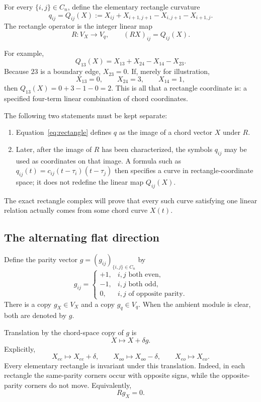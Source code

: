 \documentclass[11pt]{article}
\theoremstyle{definition}
\begin{document}
For every $\{i,j\}\in C_n$, define the elementary rectangle curvature
\begin{equation}
q_{ij}=Q_{ij}(X)
:=X_{ij}+X_{i+1,j+1}-X_{i,j+1}-X_{i+1,j}.
\label{eq:rectangle}
\end{equation}
The rectangle operator is the integer linear map
\begin{equation}
R:V_X\longrightarrow V_q,
\qquad
(RX)_{ij}=Q_{ij}(X).
\label{eq:R-map}
\end{equation}

For example,
\[
Q_{13}(X)=X_{13}+X_{24}-X_{14}-X_{23}.
\]
Because $23$ is a boundary edge, $X_{23}=0$.  If, merely for illustration,
\[
X_{13}=0,\qquad X_{24}=3,\qquad X_{14}=1,
\]
then $Q_{13}(X)=0+3-1-0=2$.  This is all that a rectangle coordinate is: a
specified four-term linear combination of chord coordinates.

The following two statements must be kept separate:
\begin{enumerate}
\item Equation~\eqref{eq:rectangle} defines $q$ as the image of a chord vector $X$ under $R$.
\item Later, after the image of $R$ has been characterized, the symbols $q_{ij}$ may be used as coordinates on that image.  A formula such as $q_{ij}(t)=c_{ij}(t-\tau_i)(t-\tau_j)$ then specifies a curve in rectangle-coordinate space; it does not redefine the linear map $Q_{ij}(X)$.
\end{enumerate}
The exact rectangle complex will prove that every such curve satisfying one linear relation actually comes from some chord curve $X(t)$.

\subsection{The alternating flat direction}

Define the parity vector $g=(g_{ij})_{\{i,j\}\in C_n}$ by
\begin{equation}
g_{ij}=
\begin{cases}
+1,&i,j\text{ both even},\\
-1,&i,j\text{ both odd},\\
0,&i,j\text{ of opposite parity}.
\end{cases}
\label{eq:g}
\end{equation}
There is a copy $g_X\in V_X$ and a copy $g_q\in V_q$.  When the ambient module is clear, both are denoted by $g$.

Translation by the chord-space copy of $g$ is
\[
X\longmapsto X+\delta g.
\]
Explicitly,
\[
X_{ee}\longmapsto X_{ee}+\delta,
\qquad
X_{oo}\longmapsto X_{oo}-\delta,
\qquad
X_{eo}\longmapsto X_{eo}.
\]
Every elementary rectangle is invariant under this translation.  Indeed, in each rectangle the same-parity corners occur with opposite signs, while the opposite-parity corners do not move.  Equivalently,
\begin{equation}
Rg_X=0.
\label{eq:Rgzero}
\end{equation}
\end{document}
